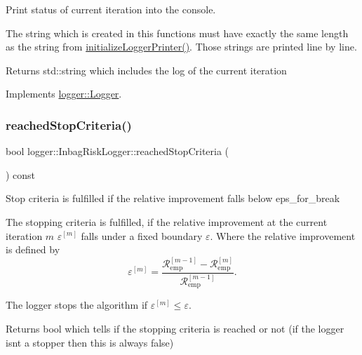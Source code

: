 Print status of current iteration into the console. 

The string which is created in this functions must have exactly the same length as the string from {\ttfamily \hyperlink{classlogger_1_1_inbag_risk_logger_ab793454f28dae8d0901852b41a910ec7}{initialize\+Logger\+Printer()}}. Those strings are printed line by line.

\begin{DoxyReturn}{Returns}
{\ttfamily std\+::string} which includes the log of the current iteration 
\end{DoxyReturn}


Implements \hyperlink{classlogger_1_1_logger_abad818a7e8053ca84cb267e883b5e377}{logger\+::\+Logger}.

\mbox{\label{classlogger_1_1_inbag_risk_logger_a17a7416e4cc9db4da3b3eda5012ad7c7}} 
\subsubsection{\texorpdfstring{reached\+Stop\+Criteria()}{reachedStopCriteria()}}
{\footnotesize\ttfamily bool logger\+::\+Inbag\+Risk\+Logger\+::reached\+Stop\+Criteria (\begin{DoxyParamCaption}{ }\end{DoxyParamCaption}) const\hspace{0.3cm}{\ttfamily [virtual]}}



Stop criteria is fulfilled if the relative improvement falls below {\ttfamily eps\+\_\+for\+\_\+break} 

The stopping criteria is fulfilled, if the relative improvement at the current iteration $m$ $\varepsilon^{[m]}$ falls under a fixed boundary $\varepsilon$. Where the relative improvement is defined by \[ \varepsilon^{[m]} = \frac{\mathcal{R}_\mathrm{emp}^{[m-1]} - \mathcal{R}_\mathrm{emp}^{[m]}}{\mathcal{R}_\mathrm{emp}^{[m-1]}}. \]

The logger stops the algorithm if $\varepsilon^{[m]} \leq \varepsilon$.

\begin{DoxyReturn}{Returns}
{\ttfamily bool} which tells if the stopping criteria is reached or not (if the logger isn\textquotesingle{}t a stopper then this is always false) 
\end{DoxyReturn}


